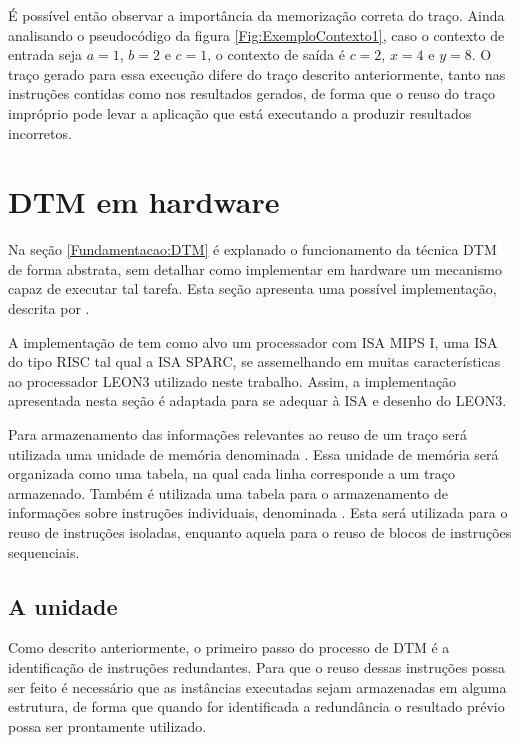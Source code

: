 É possível então observar a importância da memorização correta do traço. Ainda analisando o pseudocódigo da figura \ref{Fig:ExemploContexto1}, caso o contexto de entrada seja $a = 1$, $b = 2$ e $c = 1$, o contexto de saída é $c = 2$, $x = 4$ e $y = 8$. O traço gerado para essa execução difere do traço descrito anteriormente, tanto nas instruções contidas como nos resultados gerados, de forma que o reuso do traço impróprio pode levar a aplicação que está executando a produzir resultados incorretos.

\section{DTM em hardware}
\label{Fundamentacao:DTMHardware}

Na seção \ref{Fundamentacao:DTM} é explanado o funcionamento da técnica DTM de forma abstrata, sem detalhar como implementar em hardware um mecanismo capaz de executar tal tarefa. Esta seção apresenta uma possível implementação, descrita por .

A implementação de  tem como alvo um processador com ISA MIPS I, uma ISA do tipo RISC tal qual a ISA SPARC, se assemelhando em muitas características ao processador LEON3 utilizado neste trabalho. Assim, a implementação apresentada nesta seção é adaptada para se adequar à ISA e desenho do LEON3.

Para armazenamento das informações relevantes ao reuso de um traço será utilizada uma unidade de memória denominada \tablet. Essa unidade de memória será organizada como uma tabela, na qual cada linha corresponde a um traço armazenado. Também é utilizada uma tabela para o armazenamento de informações sobre instruções individuais, denominada \tableg. Esta será utilizada para o reuso de instruções isoladas, enquanto aquela para o reuso de blocos de instruções sequenciais.

\subsection{A unidade \tableg}
\label{Fundamentacao:DTMHardware:TableG}

Como descrito anteriormente, o primeiro passo do processo de DTM é a identificação de instruções redundantes. Para que o reuso dessas instruções possa ser feito é necessário que as instâncias executadas sejam armazenadas em alguma estrutura, de forma que quando for identificada a redundância o resultado prévio possa ser prontamente utilizado.

